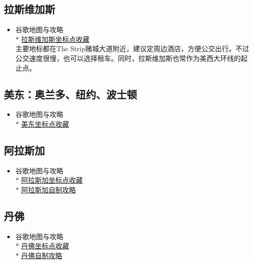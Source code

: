     \subsection{拉斯维加斯}
    \begin{itemize}
        \item 谷歌地图与攻略 \\
        $\ast$ \href{https://maps.app.goo.gl/iEPgmg8PCUejdZho8}{拉斯维加斯坐标点收藏} \\
        主要地标都在The Strip赌城大道附近，建议定周边酒店，方便公交出行。不过公交速度很慢，也可以选择租车。同时，拉斯维加斯也常作为美西大环线的起止点。
    \end{itemize}

    \subsection{美东：奥兰多、纽约、波士顿}
    \begin{itemize}
        \item 谷歌地图与攻略 \\
        $\ast$ \href{https://maps.app.goo.gl/MZNaQabDQErWrCzN7}{美东坐标点收藏} \\
    \end{itemize}

    \subsection{阿拉斯加}
    \begin{itemize}
        \item 谷歌地图与攻略 \\
        $\ast$ \href{https://maps.app.goo.gl/vSeUm3Fnf78kuK1H9}{阿拉斯加坐标点收藏} \\
        $\ast$ \href{https://docs.qq.com/sheet/DSFVSYnNuWmh4Y3VT}{阿拉斯加自制攻略} \\
    \end{itemize}

    \subsection{丹佛}
    \begin{itemize}
        \item 谷歌地图与攻略 \\
        $\ast$ \href{https://maps.app.goo.gl/icLPvppHWGdQvnYH6}{丹佛坐标点收藏} \\
        $\ast$ \href{https://docs.qq.com/sheet/DSGJiU2FsYVpnR1RH}{丹佛自制攻略} \\
    \end{itemize}

